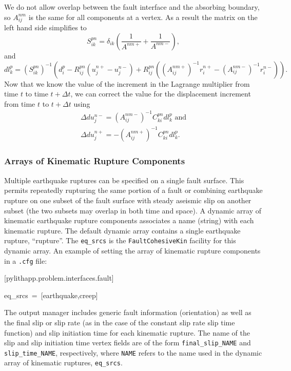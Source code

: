 We do not allow overlap between the fault interface and the absorbing
boundary, so $A_{ij}^{nm}$ is the same for all components at a vertex.
As a result the matrix on the left hand side simplifies to
\begin{equation}
S_{ik}^{pn}=\delta_{ik}\left(\frac{1}{A^{nm+}}+\frac{1}{A^{nm-}}\right),
\end{equation}
and
\begin{equation}
dl_{k}^{p}=(S_{ik}^{pn})^{-1}\left(d_{i}^{p}-R_{ij}^{pn}(u_{j}^{n+}-u_{j}^{n-})+R_{ij}^{pn}\left((A_{ij}^{nm+})^{-1}r_{i}^{n+}-(A_{ij}^{nm-})^{-1}r_{i}^{n-}\right)\right).
\end{equation}
Now that we know the value of the increment in the Lagrange multiplier
from time $t$ to time $t+\Delta t$, we can correct the value for
the displacement increment from time $t$ to $t+\Delta t$ using
\begin{gather}
\Delta du_{j}^{n-}=(A_{ij}^{nm-})^{-1}C_{ki}^{pn}dl_{k}^{p}\text{ and}\\
\Delta du_{j}^{n+}=-(A_{ij}^{nm+})^{-1}C_{ki}^{pn}dl_{k}^{p}.
\end{gather}



\subsubsection{Arrays of Kinematic Rupture Components}

Multiple earthquake ruptures can be specified on a single fault surface.
This permits repeatedly rupturing the same portion of a fault or combining
earthquake rupture on one subset of the fault surface with steady
aseismic slip on another subset (the two subsets may overlap in both
time and space). A dynamic array of kinematic earthquake rupture components
associates a name (string) with each kinematic rupture. The default
dynamic array contains a single earthquake rupture, ``rupture''. The
\texttt{eq\_srcs} is the \texttt{FaultCohesiveKin} facility for this
dynamic array. An example of setting the array of kinematic rupture
components in a \texttt{.cfg} file:
\begin{lyxcode}
{[}pylithapp.problem.interfaces.fault{]}

eq\_srcs~=~{[}earthquake,creep{]}
\end{lyxcode}
The output manager includes generic fault information (orientation)
as well as the final slip or slip rate (as in the case of the constant
slip rate slip time function) and slip initiation time for each kinematic
rupture. The name of the slip and slip initiation time vertex fields
are of the form \texttt{final\_slip\_NAME} and \texttt{slip\_time\_NAME},
respectively, where \texttt{NAME} refers to the name used in the dynamic
array of kinematic ruptures, \texttt{eq\_srcs}.

